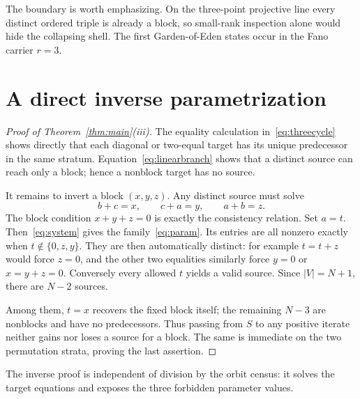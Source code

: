 \documentclass[a4paper,10pt]{amsart}
\theoremstyle{remark}
\begin{document}
The boundary is worth emphasizing.  On the three-point projective line every
distinct ordered triple is already a block, so small-rank inspection alone
would hide the collapsing shell.  The first Garden-of-Eden states occur in
the Fano carrier $r=3$.

\section{A direct inverse parametrization}\label{sec:inverse}

\begin{proof}[Proof of Theorem~\ref{thm:main}(iii)]
The equality calculation in~\eqref{eq:threecycle} shows directly that each
diagonal or two-equal target has its unique predecessor in the same stratum.
Equation~\eqref{eq:linearbranch} shows that a distinct source can reach only
a block; hence a nonblock target has no source.

It remains to invert a block $(x,y,z)$.  Any distinct source must solve
\begin{equation}\label{eq:system}
 b+c=x,\qquad c+a=y,\qquad a+b=z.
\end{equation}
The block condition $x+y+z=0$ is exactly the consistency relation.  Set
$a=t$.  Then~\eqref{eq:system} gives the family~\eqref{eq:param}.
Its entries are all nonzero exactly when $t\notin\{0,z,y\}$.  They are then
automatically distinct: for example $t=t+z$ would force $z=0$, and the other
two equalities similarly force $y=0$ or $x=y+z=0$.  Conversely every
allowed $t$ yields a valid source.  Since $|V|=N+1$, there are $N-2$ sources.

Among them, $t=x$ recovers the fixed block itself; the remaining $N-3$ are
nonblocks and have no predecessors.  Thus passing from $S$ to any positive
iterate neither gains nor loses a source for a block.  The same is immediate
on the two permutation strata, proving the last assertion.
\end{proof}

The inverse proof is independent of division by the orbit census: it solves
the target equations and exposes the three forbidden parameter values.
\end{document}
